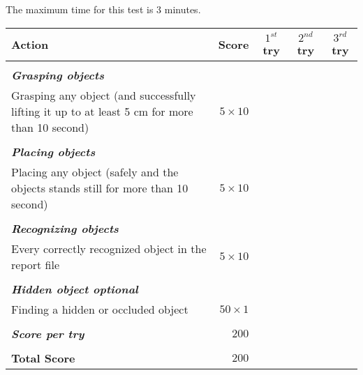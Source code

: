 
The maximum time for this test is 3 minutes.


\begin{tabularx}{\textwidth}{X r c c c }

	\textbf{Action} & \textbf{Score} & \textbf{$1^{st}$ try} & \textbf{$2^{nd}$ try} & \textbf{$3^{rd}$ try} \\ \hline
	& & & & \\ 
	\textit{\textbf{Grasping objects}} \\
	Grasping any object (and successfully lifting it up to at least 5 cm for more than 10 second) & $5 \times 10$ & \hrulefill & \hrulefill & \hrulefill \\
	& & & & \\ 
	\textit{\textbf{Placing objects}} \\
	Placing any object (safely and the objects stands still for more than 10 second) & $5 \times 10$ & \hrulefill & \hrulefill & \hrulefill \\
	& & & & \\ 
	\textit{\textbf{Recognizing objects}} \\
	Every correctly recognized object in the report file & $5 \times 10$ & \hrulefill & \hrulefill & \hrulefill \\
	& & & & \\ 
	\textit{\textbf{Hidden object optional}} \\
	Finding a hidden or occluded object & $50 \times 1$ & \hrulefill & \hrulefill & \hrulefill \\ \hline
	& & & & \\ 
	\textit{\textbf{Score per try}} & $200$ & \hrulefill & \hrulefill & \hrulefill \\ 
	& & & & \\ 
	\textbf{Total Score} & $200$ & & & \\ \cline{3-5}

\end{tabularx}\\



